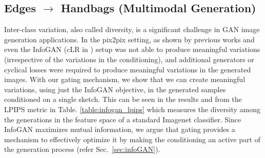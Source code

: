 \subsection{Edges $\rightarrow$ Handbags (Multimodal Generation)}
\label{sec:multimodal}
Inter-class variation, also called diversity, is a significant challenge in GAN image generation applications. 
In the pix2pix setting, as shown by previous works \cite{ghosh2017multi} and \cite{zhu2017toward} even the InfoGAN (cLR in \cite{zhu2017toward}) setup was not able to produce meaningful variations (irrespective of the variations in the conditioning), and additional generators or cyclical losses were required to produce meaningful variations in the generated images. 
With our gating mechanism, we show that we can create meaningful variations, using just the InfoGAN objective, in the generated samples conditioned on a single sketch.
This can be seen in the results  and from the LPIPS metric \cite{zhang2018unreasonable} in  Table. \ref{table:infogan_lpips} which measures the diversity among the generations in the feature space of a standard Imagenet classifier.
Since InfoGAN maximizes mutual information, we argue that gating provides a mechanism to effectively optimize it by making the conditioning an active part of the generation process (refer Sec.~\ref{sec:infoGAN}).


